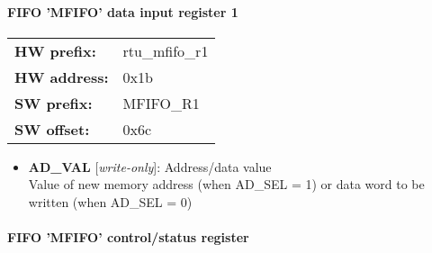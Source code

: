 \paragraph*{FIFO 'MFIFO' data input register 1}\vspace{12pt}

\begin{tabular}{l l }
{\bf HW prefix:}  & rtu\_mfifo\_r1\\
{\bf HW address:}  & 0x1b\\
{\bf SW prefix:}  & MFIFO\_R1\\
{\bf SW offset:}  & 0x6c\\
\end{tabular}


\vspace{12pt}
\noindent
{}

\begin{itemize}
\item \begin{small}
{\bf 
AD\_VAL
} [\emph{write-only}]: Address/data value
\\
Value of new memory address (when AD\_SEL = 1) or data word to be written (when AD\_SEL = 0)
\end{small}
\end{itemize}
\paragraph*{FIFO 'MFIFO' control/status register}\vspace{12pt}

